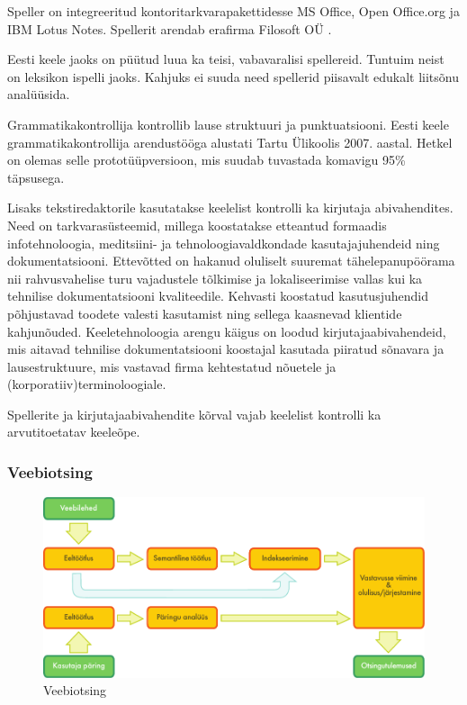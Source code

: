 \begin{multicols}{2}
Speller on integreeritud kontoritarkvarapakettidesse MS Office, Open Office.org ja IBM Lotus Notes. 
Spellerit arendab era\-firma Filosoft OÜ \cite{Filosoft}.

Eesti keele jaoks on püütud luua ka teisi, vabavaralisi spellereid. 
Tuntuim neist on leksikon ispelli jaoks. 
Kahjuks ei suuda need spellerid piisavalt edukalt liitsõnu analüüsida.

Grammatikakontrollija kontrollib lause struktuuri ja punktuatsiooni. 
Eesti keele grammatikakontrollija arendustööga alustati Tartu Ülikoolis 2007. aastal.
Hetkel on olemas selle prototüüpversioon, mis suu\-dab tuvastada komavigu 95\% täpsusega.

Lisaks tekstiredaktorile kasutatakse keelelist kontrolli ka kirjutaja abivahendites.  Need on tarkvarasüsteemid, millega koostatakse etteantud formaadis infotehnoloogia, meditsiini- ja tehnoloogiavaldkondade kasutajajuhendeid ning dokumentatsiooni.  Ettevõtted on hakanud oluliselt suuremat tähelepanupöörama nii rahvusvahelise turu vajadustele tõlkimise ja lokaliseerimise vallas kui ka tehnilise dokumentatsiooni kvaliteedile.  Kehvasti koostatud kasutusjuhendid põhjustavad toodete valesti kasutamist ning sellega kaasnevad klientide kahjunõuded.  Keeletehnoloogia arengu käigus on loodud kirjutajaabivahendeid, mis aitavad tehnilise dokumentatsiooni koostajal kasutada piiratud sõnavara ja lausestruktuure, mis vastavad firma kehtestatud nõuetele ja (korporatiiv)terminoloogiale.

Spellerite ja kirjutajaabivahendite kõrval vajab keelelist kontrolli ka arvutitoetatav keeleõpe. 

\subsubsection{Veebiotsing}

\begin{figure}[htb]
  \center
  \includegraphics[width=\textwidth]{../_media/estonian/web_search_architecture}
  \caption{Veebiotsing}
  \label{fig:websearcharch_ee}
  \vspace*{1mm}
\end{figure}


\end{multicols}
